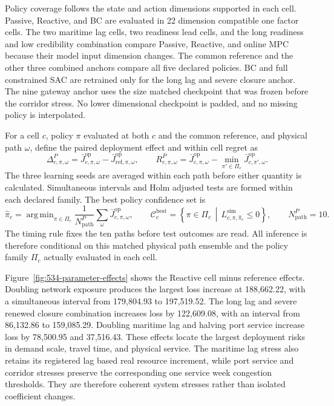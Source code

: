 \documentclass[a4paper,fleqn]{cas-sc}
\DeclareMathOperator*{\argmin}{arg\,min}
\begin{document}
Policy coverage follows the state and action dimensions supported in each
cell. Passive, Reactive, and BC are evaluated in 22 dimension compatible one
factor cells. The two maritime lag cells, two readiness lead cells, and the
long readiness and low credibility combination compare Passive, Reactive, and
online MPC because their model input dimension changes. The common reference
and the other three combined anchors compare all five declared policies. BC
and full constrained SAC are retrained only for the long lag and severe closure
anchor. The nine gateway anchor uses the size matched checkpoint that was
frozen before the corridor stress. No lower dimensional checkpoint is padded,
and no missing policy is interpolated.

For a cell $c$, policy $\pi$ evaluated at both $c$ and the common reference,
and physical path $\omega$, define the paired deployment effect and within cell
regret as
\begin{equation}
 \Delta^P_{c,\pi,\omega}
 =\bar J^{\mathrm{op}}_{c,\pi,\omega}
 -\bar J^{\mathrm{op}}_{\mathrm{ref},\pi,\omega},
 \qquad
 R^P_{c,\pi,\omega}
 =\bar J^{\mathrm{op}}_{c,\pi,\omega}
 -\min_{\pi'\in\Pi_c}
 \bar J^{\mathrm{op}}_{c,\pi',\omega}.
 \label{eq:parameter-robustness-effects}
\end{equation}
The three learning seeds are averaged within each path before either quantity
is calculated. Simultaneous intervals and Holm adjusted tests are formed within
each declared family. The best policy confidence set is
\begin{equation}
 \widehat\pi_c=
 \argmin_{\pi\in\Pi_c}\frac{1}{N^P_{\mathrm{path}}}
 \sum_{\omega}\bar J^{\mathrm{op}}_{c,\pi,\omega},
 \qquad
 \mathcal C^{\mathrm{best}}_c=
 \left\{\pi\in\Pi_c\,\middle|\,
 L^{\mathrm{sim}}_{c,\pi,\widehat\pi_c}\leq0\right\},
 \qquad N^P_{\mathrm{path}}=10.
 \label{eq:parameter-robustness-confidence-set}
\end{equation}
The timing rule fixes the ten paths before test outcomes are read. All
inference is therefore conditional on this matched physical path ensemble and
the policy family $\Pi_c$ actually evaluated in each cell.

Figure~\ref{fig:534-parameter-effects} shows the Reactive cell minus reference
effects. Doubling network exposure produces the largest loss increase at
188,662.22, with a simultaneous interval from 179,804.93 to 197,519.52. The
long lag and severe renewed closure combination increases loss by 122,609.08,
with an interval from 86,132.86 to 159,085.29. Doubling maritime lag and halving
port service increase loss by 78,500.95 and 37,516.43. These effects locate the
largest deployment risks in demand scale, travel time, and physical service.
The maritime lag stress also retains its registered lag based real resource
increment, while port service and corridor stresses preserve the corresponding
one service week congestion thresholds. They are therefore coherent system
stresses rather than isolated coefficient changes.
\end{document}
